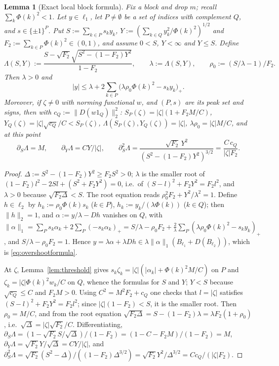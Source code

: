 \documentclass[10pt]{amsart}
\newtheorem{lemma}[theorem]{Lemma}
\theoremstyle{definition}
\theoremstyle{remark}
\begin{document}
\begin{lemma}[Exact local block formula]\label{lem:localformula}
Fix a block and drop $m$; recall $\sum_k\Phi(k)^2<1$.  Let $y\in\ell_1$, let
$P\ne\emptyset$ be a set of indices with complement $Q$, and
$s\in\{\pm1\}^P$.  Put $S:=\sum_{k\in P}s_ky_k$,
$Y:=(\sum_{k\in Q}y_k^2/\Phi(k)^2)^{1/2}$ and $F_2:=\sum_{k\in P}\Phi(k)^2\in
(0,1)$, and assume $0<S$, $Y<\infty$ and $Y\le S$.  Define
\[
 \Lambda(S,Y):=\frac{S-\sqrt{F_2}\sqrt{S^2-(1-F_2)Y^2}}{1-F_2},\qquad
 \lambda:=\Lambda(S,Y),\qquad \rho_0:=(S/\lambda-1)/F_2 .
\]
Then $\lambda>0$ and
\begin{equation}\label{eq:overshootformula}
 |y|\le\lambda+2\sum_{k\in P}\big(\lambda\rho_0\Phi(k)^2-s_ky_k\big)_+ .
\end{equation}
Moreover, if $\zeta\ne0$ with norming functional $w$, and $(P,s)$ are its
peak set and signs, then with $c_Q:=\|D(w1_Q)\|_2^2$:
$S_P(\zeta)=|\zeta|(1+F_2M/C)$, $Y_Q(\zeta)=|\zeta|\sqrt{c_Q}/C<S_P(\zeta)$,
$\Lambda(S_P(\zeta),Y_Q(\zeta))=|\zeta|$, $\lambda\rho_0=|\zeta|M/C$, and at
this point
\[
 \partial_S\Lambda=M,\qquad \partial_Y\Lambda=CY/|\zeta|,\qquad
 \partial_S^2\Lambda=\frac{\sqrt{F_2}\,Y^2}{(S^2-(1-F_2)Y^2)^{3/2}}
 =\frac{C\,c_Q}{|\zeta|F_2}.
\]
\end{lemma}

\begin{proof}
$\Delta:=S^2-(1-F_2)Y^2\ge F_2S^2>0$; $\lambda$ is the smaller root of
$(1-F_2)l^2-2Sl+(S^2+F_2Y^2)=0$, i.e.\ of $(S-l)^2+F_2Y^2=F_2l^2$, and
$\lambda>0$ because $\sqrt{F_2\Delta}<S$.  The root equation reads
$\rho_0^2F_2+Y^2/\lambda^2=1$.  Define $h\in\ell_2$ by
$h_k:=\rho_0\Phi(k)s_k$ ($k\in P$), $h_k:=y_k/(\lambda\Phi(k))$ ($k\in Q$);
then $\|h\|_2=1$, and $\alpha:=y/\lambda-Dh$ vanishes on $Q$, with
$\|\alpha\|_1=\sum_Ps_k\alpha_k+2\sum_P(-s_k\alpha_k)_+=S/\lambda-\rho_0F_2
+\frac2\lambda\sum_P(\lambda\rho_0\Phi(k)^2-s_ky_k)_+$, and
$S/\lambda-\rho_0F_2=1$.  Hence $y=\lambda\alpha+\lambda Dh\in\lambda
\|\alpha\|_1(B_{\ell_1}+D(B_{\ell_2}))$, which is \eqref{eq:overshootformula}.

At $\zeta$, Lemma~\ref{lem:threshold} gives $s_k\zeta_k=|\zeta|(|\alpha_k|+
\Phi(k)^2M/C)$ on $P$ and $\zeta_k=|\zeta|\Phi(k)^2w_k/C$ on $Q$, whence
the formulas for $S$ and $Y$; $Y<S$ because $\sqrt{c_Q}\le C$ and $F_2M>0$.
Using $C^2=M^2F_2+c_Q$ one checks that $l=|\zeta|$ satisfies
$(S-l)^2+F_2Y^2=F_2l^2$; since $|\zeta|(1-F_2)<S$, it is the smaller root.
Then $\rho_0=M/C$, and from the root equation
$\sqrt{F_2\Delta}=S-(1-F_2)\lambda=\lambda F_2(1+\rho_0)$, i.e.\
$\sqrt\Delta=|\zeta|\sqrt{F_2}/C$.  Differentiating,
$\partial_S\Lambda=(1-\sqrt{F_2}S/\sqrt\Delta)/(1-F_2)=(1-C-F_2M)/(1-F_2)=M$,
$\partial_Y\Lambda=\sqrt{F_2}Y/\sqrt\Delta=CY/|\zeta|$, and
$\partial^2_S\Lambda=\sqrt{F_2}(S^2-\Delta)/((1-F_2)\Delta^{3/2})=
\sqrt{F_2}Y^2/\Delta^{3/2}=Cc_Q/(|\zeta|F_2)$.
\end{proof}
\end{document}
